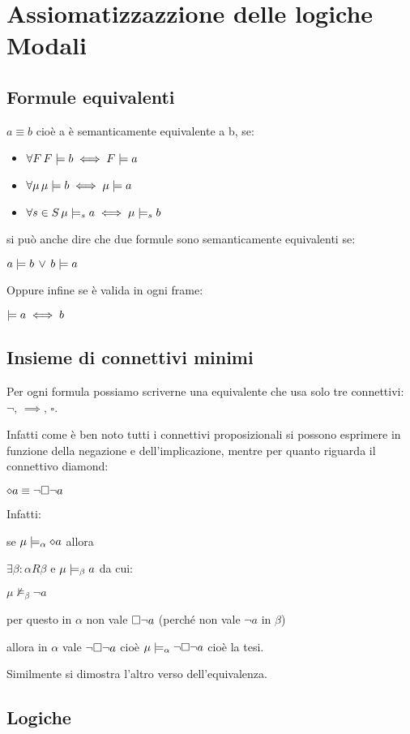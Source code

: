 
\chapter{Assiomatizzazzione delle logiche Modali}


\section{Formule equivalenti}

$a\equiv b$ cioè a è semanticamente equivalente a b, se:
\begin{itemize}
\item $\forall F\,F\models b\iff F\models a$
\item $\forall\mu\,\mu\models b\iff\mu\models a$
\item $\forall s\in S\,\mu\models_{s}a\iff\mu\models_{s}b$
\end{itemize}
si può anche dire che due formule sono semanticamente equivalenti
se:

$a\models b\,\vee\,b\models a$

Oppure infine se è valida in ogni frame:

$\models a\iff b$


\section{Insieme di connettivi minimi}

Per ogni formula possiamo scriverne una equivalente che usa solo tre
connettivi: $\neg,\,\implies,\,\square$.

Infatti come è ben noto tutti i connettivi proposizionali si possono
esprimere in funzione della negazione e dell'implicazione, mentre
per quanto riguarda il connettivo diamond:

$\diamond a\equiv\neg\square\neg a$

Infatti:

se $\mu\models_{\alpha}\diamond a$ allora

$\exists\beta:$$\alpha R\beta$ e $\mu\models_{\beta}a$ da cui:

$\mu\nvDash_{\beta}\neg a$

per questo in $\alpha$ non vale $\square\neg a$ (perché non vale
$\neg a$ in $\beta$)

allora in $\alpha$ vale $\neg\square\neg a$ cioè $\mu\models_{\alpha}\neg\square\neg a$
cioè la tesi. 

Similmente si dimostra l'altro verso dell'equivalenza.


\section{Logiche}


